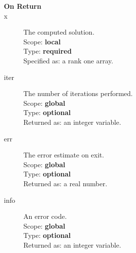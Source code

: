 \begin{description}
\item[\bf On Return] 
\item[x] The computed solution. \\
Scope: {\bf local} \\
Type: {\bf required}\\
Specified as: a rank one array.
\item[iter]  The number of iterations performed.\\
Scope: {\bf global} \\
Type: {\bf optional}\\
Returned  as: an integer variable.
\item[err]  The error estimate on exit.\\
Scope: {\bf global} \\
Type: {\bf optional}\\
Returned  as: a real number.
\item[info]  An error code.\\
Scope: {\bf global} \\
Type: {\bf optional}\\
Returned  as: an integer variable.
\end{description}





